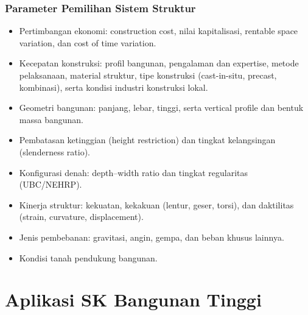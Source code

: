 \documentclass[../skb.tex]{subfiles}
\begin{document}
\begin{frame}[t,mycolor=digiPH_leaf,mytitle=standard,dark]
	\frametitle{Parameter Pemilihan Sistem Struktur}

	\begin{itemize}

		\item Pertimbangan ekonomi: construction cost, nilai kapitalisasi,
		      rentable space variation, dan cost of time variation.

		\item Kecepatan konstruksi: profil bangunan, pengalaman dan expertise,
		      metode pelaksanaan, material struktur, tipe konstruksi (cast-in-situ,
		      precast, kombinasi), serta kondisi industri konstruksi lokal.

		\item Geometri bangunan: panjang, lebar, tinggi, serta vertical profile
		      dan bentuk massa bangunan.

		\item Pembatasan ketinggian (height restriction) dan tingkat kelangsingan
		      (slenderness ratio).

		\item Konfigurasi denah: depth–width ratio dan tingkat regularitas
		      (UBC/NEHRP).

		\item Kinerja struktur: kekuatan, kekakuan (lentur, geser, torsi),
		      dan daktilitas (strain, curvature, displacement).

		\item Jenis pembebanan: gravitasi, angin, gempa, dan beban khusus lainnya.

		\item Kondisi tanah pendukung bangunan.

	\end{itemize}

\end{frame}

\section{Aplikasi SK Bangunan Tinggi}%
\label{sec:Aplikasi SK Bangunan Tinggi}

\begin{frame}[c,mybg=pg_5,mytitle=standard,dark]\end{frame}
\end{document}
